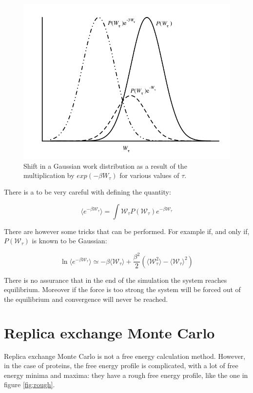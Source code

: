 	\begin{figure}[H]
		\centering
		\includegraphics[scale=0.5]{dist}
		\caption{Shift in a Gaussian work distribution as a result of the multiplication by $exp(- \beta W_{\tau})$ for various values of $\tau$.}
		\label{fig:dist}
	\end{figure}


	There is a to be very careful with defining the quantity:

	$$\langle e^{-\beta\mathcal{W}_\tau}\rangle= \int\mathcal{W}_\tau P(\mathcal{W}_\tau)e^{-\beta\mathcal{W}_\tau}$$

	There are however some tricks that can be performed.
	For example if, and only if, $P(\mathcal{W}_\tau)$ is known to be Gaussian:

	$$\ln\langle e^{-\beta\mathcal{W}_\tau}\rangle\simeq-\beta\langle\mathcal{W}_\tau\rangle + \frac{\beta^2}{2}(\langle\mathcal{W}_\tau^2\rangle-\langle\mathcal{W}_\tau\rangle^2)$$

	There is no assurance that in the end of the simulation the system reaches equilibrium.
	Moreover if the force is too strong the system will be forced out of the equilibrium and convergence will never be reached.

\section{Replica exchange Monte Carlo}
Replica exchange Monte Carlo is not a free energy calculation method.
However, in the case of proteins, the free energy profile is complicated, with a lot of free energy minima and maxima: they have a rough free energy profile, like the one in figure \ref{fig:rough}.

